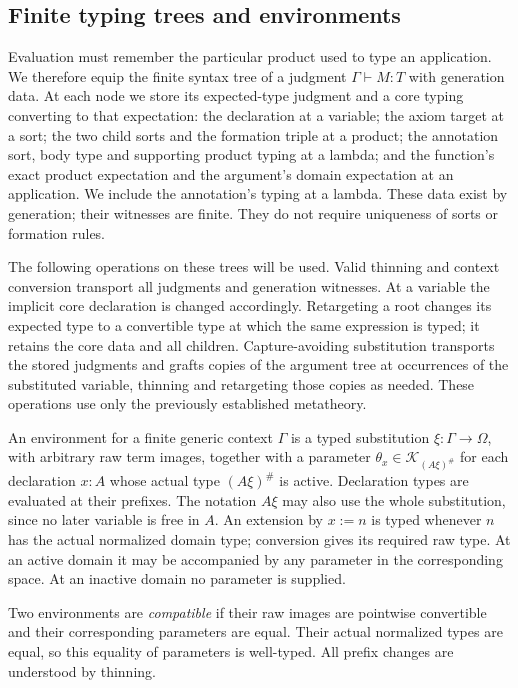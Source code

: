 

\subsection{Finite typing trees and environments}
\label{obs:trees}

Evaluation must remember the particular product used to type an
application.  We therefore equip the finite syntax tree of a judgment
$\Gamma\vdash M:T$ with generation data.  At each node we store its
expected-type judgment and a core typing converting to that expectation:
the declaration at a variable; the axiom target at a sort; the two child
sorts and the formation triple at a product; the annotation sort, body
type and supporting product typing at a lambda; and the function's
exact product expectation and the argument's domain expectation at an
application.  We include the annotation's typing at a lambda.  These
data exist by generation; their witnesses are finite.  They do not
require uniqueness of sorts or formation rules.

The following operations on these trees will be used.  Valid thinning
and context conversion transport all judgments and generation witnesses.
At a variable the implicit core declaration is changed accordingly.
Retargeting a root changes its expected type to a convertible type at
which the same expression is typed; it retains the core data and all
children.  Capture-avoiding substitution transports the stored judgments
and grafts copies of the argument tree at occurrences of the substituted
variable, thinning and retargeting those copies as needed.  These
operations use only the previously established metatheory.

An environment for a finite generic context $\Gamma$ is a typed
substitution $\xi:\Gamma\to\Omega$, with arbitrary raw term images,
together with a parameter $\theta_x\in\mathcal K_{(A\xi)^\#}$ for each
declaration $x:A$ whose actual type $(A\xi)^\#$ is active.  Declaration
types are evaluated at their prefixes.  The notation $A\xi$ may also
use the whole substitution, since no later variable is free in $A$.
An extension by $x:=n$ is typed whenever $n$ has the actual normalized
domain type; conversion gives its required raw type.  At an active
domain it may be accompanied by any parameter in the corresponding
space.  At an inactive domain no parameter is supplied.

Two environments are \emph{compatible} if their raw images are
pointwise convertible and their corresponding parameters are equal.
Their actual normalized types are equal, so this equality of parameters
is well-typed.  All prefix changes are understood by thinning.


